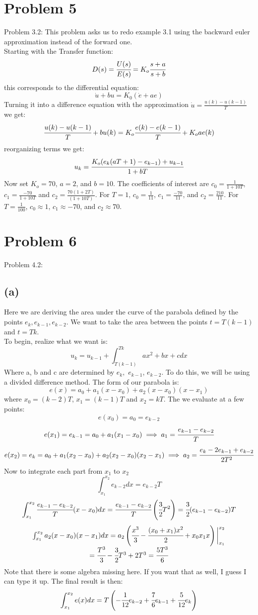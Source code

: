 \documentclass{article}
\begin{document}
\section*{Problem 5}
Problem 3.2: This problem asks us to redo example 3.1 using the backward euler approximation instead of the forward one.\\
Starting with the Transfer function:
\[D(s)=\cfrac{U(s)}{E(s)}=K_o\cfrac{s+a}{s+b}\]
this corresponds to the differential equation:
\[\dot{u}+bu=K_0(\dot{e}+ae)\]
Turning it into a difference equation with the approximation $\dot{u}=\frac{u(k)-u(k-1)}{T}$ we get:
\[\cfrac{u(k)-u(k-1)}{T}+bu(k)=K_o\cfrac{e(k)-e(k-1)}{T}+K_oae(k)\]
reorganizing terms we get:
\[u_k=\cfrac{K_o(e_k(aT+1)-e_{k-1})+u_{k-1}}{1+bT}\]
Now set $K_o=70$, $a=2$, and $b=10$. The coefficients of interest are $c_0=\frac{1}{1+10T}$, $c_1=\frac{-70}{1+10T}$ and $c_2=\frac{70(1+2T)}{(1+10T)}$. For $T=1$, $c_0=\frac{1}{11}$, $c_1=\frac{-70}{11}$, and $c_2=\frac{210}{11}$. For $T=\frac{1}{100}$, $c_0\approx 1$, $c_1\approx -70$, and $c_2\approx 70$.

\section*{Problem 6}
Problem 4.2:
\subsection*{(a)}
Here we are deriving the area under the curve of the parabola defined by the points $e_k, e_{k-1}, e_{k-2}$. We want to take the area between the points $t=T(k-1)$ and $t=Tk$.\\
To begin, realize what we want is:
\[u_k=u_{k-1}+\int_{T(k-1)}^{Tk} ax^2+bx+c dx\]
Where a, b and c are determined by $e_k,$ $e_{k-1}$, $e_{k-2}$. To do this, we will be using a divided difference method. The form of our parabola is:
\[e(x)=a_0+a_1(x-x_0)+a_2(x-x_0)(x-x_1)\]
where $x_0=(k-2)T$, $x_1=(k-1)T$ and $x_2=kT$. The we evaluate at a few points:
\[e(x_0)=a_0=e_{k-2}\]
\[e(x_1)=e_{k-1}=a_0+a_1(x_1-x_0)\implies a_1=\cfrac{e_{k-1}-e_{k-2}}{T}\]
\[e(x_2)=e_k=a_0+a_1(x_2-x_0)+a_2(x_2-x_0)(x_2-x_1)\implies a_2=\cfrac{e_k-2e_{k-1}+e_{k-2}}{2T^2}\]
Now to integrate each part from $x_1$ to $x_2$
\[\int_{x_1}^{x_2}e_{k-2}dx=e_{k-2}T\]
\[\int_{x_1}^{x_2}\cfrac{e_{k-1}-e_{k-2}}{T}(x-x_0)dx=\cfrac{e_{k-1}-e_{k-2}}{T}\left (\cfrac{3}{2}T^2\right )=\cfrac{3}{2}(e_{k-1}-e_{k-2})T\]
\[\begin{array}{c}\int_{x_1}^{x_2}a_2(x-x_0)(x-x_1)dx=a_2 \left (\cfrac{x^3}{3}-\cfrac{(x_0+x_1)x^2}{2}+x_0x_1x\right )\bigg |_{x_1}^{x_2}\\
=\cfrac{T^3}{3}-\cfrac{3}{2}T^3+2T^3=\cfrac{5T^3}{6}\end{array}\]
Note that there is some algebra missing here. If you want that as well, I guess I can type it up. The final result is then:
\[\int_{x_1}^{x_2}e(x)dx=T\left (-\cfrac{1}{12}e_{k-2}+\cfrac{7}{6}e_{k-1}+\cfrac{5}{12}e_k\right )\]
\end{document}

